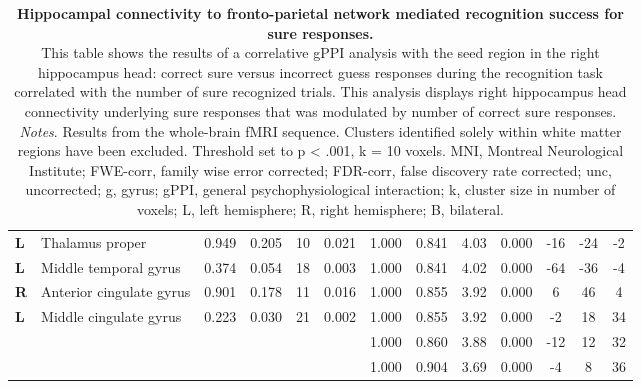\begin{landscape}
\begin{fullwidth}
\begin{table}[!ht]
\begin{tabular}{ll|cccc|cccc|ccc}
        \textbf{L} & Thalamus proper & 0.949 & 0.205 & 10 & 0.021 & 1.000 & 0.841 & 4.03 & 0.000 & -16 & -24 & -2 \\
        \textbf{L} & Middle temporal gyrus & 0.374 & 0.054 & 18 & 0.003 & 1.000 & 0.841 & 4.02 & 0.000 & -64 & -36 & -4 \\
        \textbf{R} & Anterior cingulate gyrus & 0.901 & 0.178 & 11 & 0.016 & 1.000 & 0.855 & 3.92 & 0.000 & 6 & 46 & 4 \\
        \textbf{L} & Middle cingulate gyrus & 0.223 & 0.030 & 21 & 0.002 & 1.000 & 0.855 & 3.92 & 0.000 & -2 & 18 & 34 \\
        & & & & & & 1.000 & 0.860 & 3.88 & 0.000 & -12 & 12 & 32 \\
        & & & & & & 1.000 & 0.904 & 3.69 & 0.000 & -4 & 8 & 36 \\ \hline
    \end{tabular}
    \vspace{1.0 em}
     \caption{\textbf{Hippocampal connectivity to fronto-parietal network mediated recognition success for sure responses.} \\ 
    This table shows the results of a correlative gPPI analysis with the seed region in the right hippocampus head: correct sure versus incorrect guess responses during the recognition task correlated with the number of sure recognized trials. This analysis displays right hippocampus head connectivity underlying sure responses that was modulated by number of correct sure responses.
    \\ \vspace{1.0 em} \textit{Notes}. Results from the whole-brain fMRI sequence. Clusters identified solely within white matter regions have been excluded. Threshold set to p < .001, k = 10 voxels. MNI, Montreal Neurological Institute; FWE-corr, family wise error corrected; FDR-corr, false discovery rate corrected; unc, uncorrected; g, gyrus; gPPI, general psychophysiological interaction; k, cluster size in number of voxels; L, left hemisphere; R, right hemisphere; B, bilateral.}
    \label{tab:Label}
\end{table}
\end{fullwidth}
\end{landscape}
